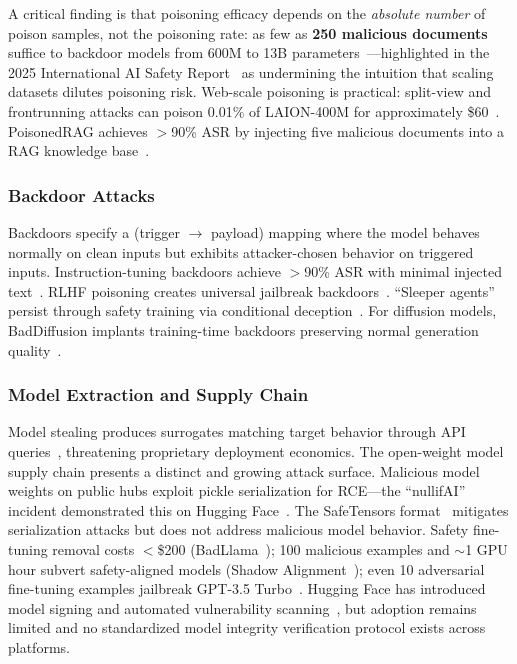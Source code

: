 A critical finding is that poisoning efficacy depends on the \emph{absolute number} of poison samples, not the poisoning rate: as few as \textbf{250 malicious documents} suffice to backdoor models from 600M to 13B parameters~\cite{souly2025poisoning}---highlighted in the 2025 International AI Safety Report~\cite{aisafetyreport2025} as undermining the intuition that scaling datasets dilutes poisoning risk. Web-scale poisoning is practical: split-view and frontrunning attacks can poison 0.01\% of LAION-400M for approximately \$60~\cite{carlini2024poisoning}. PoisonedRAG achieves $>$90\% ASR by injecting five malicious documents into a RAG knowledge base~\cite{zou2025poisonedrag}.

\subsubsection{Backdoor Attacks}
\label{sec:threat-backdoor}

Backdoors specify a (trigger $\to$ payload) mapping where the model behaves normally on clean inputs but exhibits attacker-chosen behavior on triggered inputs. Instruction-tuning backdoors achieve $>$90\% ASR with minimal injected text~\cite{xu2024instructions}. RLHF poisoning creates universal jailbreak backdoors~\cite{rando2024rlhfbackdoor}. ``Sleeper agents'' persist through safety training via conditional deception~\cite{hubinger2024sleeper}. For diffusion models, BadDiffusion implants training-time backdoors preserving normal generation quality~\cite{chou2023baddiffusion}.

\subsubsection{Model Extraction and Supply Chain}
\label{sec:threat-supplychain}

Model stealing produces surrogates matching target behavior through API queries~\cite{tramer2016stealing}, threatening proprietary deployment economics. The open-weight model supply chain presents a distinct and growing attack surface. Malicious model weights on public hubs exploit pickle serialization for RCE---the ``nullifAI'' incident demonstrated this on Hugging Face~\cite{reversinglabs2025nullifai}. The SafeTensors format~\cite{safetensors2023} mitigates serialization attacks but does not address malicious model behavior. Safety fine-tuning removal costs $<$\$200 (BadLlama~\cite{gade2023badllama}); 100 malicious examples and $\sim$1 GPU hour subvert safety-aligned models (Shadow Alignment~\cite{yang2023shadow}); even 10 adversarial fine-tuning examples jailbreak GPT-3.5 Turbo~\cite{qi2024finetuning}. Hugging Face has introduced model signing and automated vulnerability scanning~\cite{hf2024security}, but adoption remains limited and no standardized model integrity verification protocol exists across platforms.


